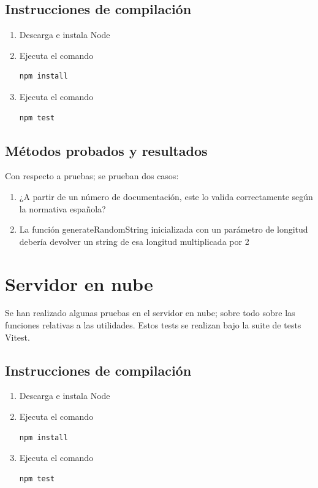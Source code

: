 \documentclass[12pt,a4paper,twoside,openright]{book}
\begin{document}
\subsection{Instrucciones de compilación}

\begin{enumerate}
  \item Descarga e instala Node
  \item Ejecuta el comando \begin{verbatim}npm install\end{verbatim}
  \item Ejecuta el comando \begin{verbatim}npm test\end{verbatim}
\end{enumerate}

\subsection{Métodos probados y resultados}

Con respecto a pruebas; se prueban dos casos:

\begin{enumerate}
  \item ¿A partir de un número de documentación, este lo valida correctamente según la normativa española?
  \item La función generateRandomString inicializada con un parámetro de longitud debería devolver un string de esa longitud multiplicada por 2 
\end{enumerate}

\section{Servidor en nube}

Se han realizado algunas pruebas en el servidor en nube; sobre todo sobre las funciones relativas a las utilidades. Estos tests se realizan bajo la suite de tests Vitest.

\subsection{Instrucciones de compilación}

\begin{enumerate}
  \item Descarga e instala Node
  \item Ejecuta el comando \begin{verbatim}npm install\end{verbatim}
  \item Ejecuta el comando \begin{verbatim}npm test\end{verbatim}
\end{enumerate}
\end{document}
